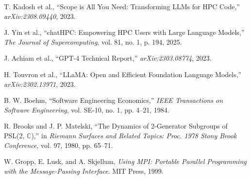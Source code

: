 T. Kadosh et al., ``Scope is All You Need: Transforming LLMs for HPC Code,''
\emph{arXiv:2308.09440}, 2023.

J. Yin et al., ``chatHPC: Empowering HPC Users with Large Language Models,''
\emph{The Journal of Supercomputing}, vol. 81, no. 1, p. 194, 2025.

J. Achiam et al., ``GPT-4 Technical Report,'' \emph{arXiv:2303.08774}, 2023.

H. Touvron et al., ``LLaMA: Open and Efficient Foundation Language Models,''
\emph{arXiv:2302.13971}, 2023.

B. W. Boehm, ``Software Engineering Economics,'' \emph{IEEE Transactions on
Software Engineering}, vol. SE-10, no. 1, pp. 4--21, 1984.

R. Brooks and J. P. Matelski, ``The Dynamics of 2-Generator Subgroups of
PSL(2, $\mathbb{C}$),'' in \emph{Riemann Surfaces and Related Topics: Proc. 1978
Stony Brook Conference}, vol. 97, 1980, pp. 65--71.

W. Gropp, E. Lusk, and A. Skjellum, \emph{Using MPI: Portable Parallel Programming
with the Message-Passing Interface}. MIT Press, 1999.
